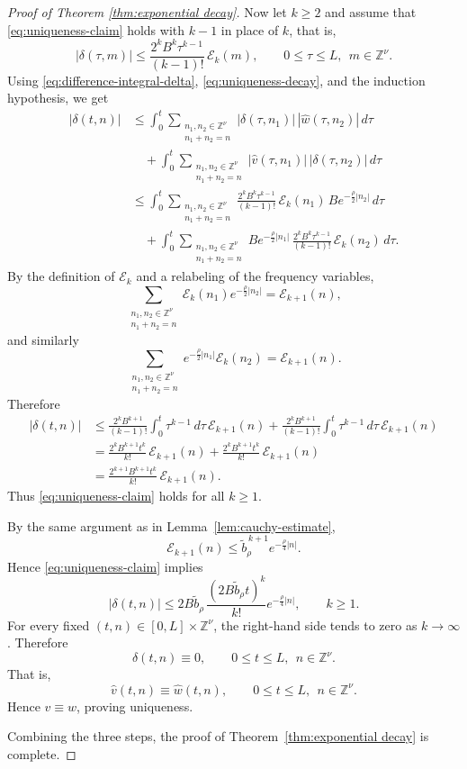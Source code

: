 \documentclass[12pt,reqno,tbtags]{amsart}
\newcommand\1{\mathbbm{1}}
\begin{document}
\begin{proof}[Proof of Theorem \ref{thm:exponential decay}]
Now let $k\geq 2$ and assume that \eqref{eq:uniqueness-claim} holds with $k-1$
in place of $k$, that is,
\[
|\delta(\tau,m)|
\leq
\frac{2^{k}B^{k}\tau^{k-1}}{(k-1)!}\,\mathcal{E}_{k}(m),
\qquad
0\leq \tau\leq L,\ \ m\in \mathbb{Z}^{\nu}.
\]
Using \eqref{eq:difference-integral-delta}, \eqref{eq:uniqueness-decay}, and the
induction hypothesis, we get
\begin{align*}
|\delta(t,n)|
&\leq
\int_0^t
\sum_{\substack{n_1,n_2\in \mathbb{Z}^{\nu}\\ n_1+n_2=n}}
|\delta(\tau,n_1)|\,|\widehat w(\tau,n_2)|\,d\tau \\
&\quad+
\int_0^t
\sum_{\substack{n_1,n_2\in \mathbb{Z}^{\nu}\\ n_1+n_2=n}}
|\widehat v(\tau,n_1)|\,|\delta(\tau,n_2)|\,d\tau \\
&\leq
\int_0^t
\sum_{\substack{n_1,n_2\in \mathbb{Z}^{\nu}\\ n_1+n_2=n}}
\frac{2^{k}B^{k}\tau^{k-1}}{(k-1)!}\,\mathcal{E}_{k}(n_1)\,
B e^{-\frac{\rho}{2}|n_2|}\,d\tau \\
&\quad+
\int_0^t
\sum_{\substack{n_1,n_2\in \mathbb{Z}^{\nu}\\ n_1+n_2=n}}
B e^{-\frac{\rho}{2}|n_1|}\,
\frac{2^{k}B^{k}\tau^{k-1}}{(k-1)!}\,\mathcal{E}_{k}(n_2)\,d\tau .
\end{align*}
By the definition of $\mathcal{E}_{k}$ and a relabeling of the frequency variables,
\[
\sum_{\substack{n_1,n_2\in \mathbb{Z}^{\nu}\\ n_1+n_2=n}}
\mathcal{E}_{k}(n_1)e^{-\frac{\rho}{2}|n_2|}
=
\mathcal{E}_{k+1}(n),
\]
and similarly
\[
\sum_{\substack{n_1,n_2\in \mathbb{Z}^{\nu}\\ n_1+n_2=n}}
e^{-\frac{\rho}{2}|n_1|}\mathcal{E}_{k}(n_2)
=
\mathcal{E}_{k+1}(n).
\]
Therefore
\begin{align*}
|\delta(t,n)|
&\leq
\frac{2^{k}B^{k+1}}{(k-1)!}
\int_0^t \tau^{k-1}\,d\tau \, \mathcal{E}_{k+1}(n)
+
\frac{2^{k}B^{k+1}}{(k-1)!}
\int_0^t \tau^{k-1}\,d\tau \, \mathcal{E}_{k+1}(n) \\
&=
\frac{2^{k}B^{k+1}t^k}{k!}\,\mathcal{E}_{k+1}(n)
+
\frac{2^{k}B^{k+1}t^k}{k!}\,\mathcal{E}_{k+1}(n) \\
&=
\frac{2^{k+1}B^{k+1}t^k}{k!}\,\mathcal{E}_{k+1}(n).
\end{align*}
Thus \eqref{eq:uniqueness-claim} holds for all $k\geq 1$.

By the same argument as in Lemma~\ref{lem:cauchy-estimate},
\[
\mathcal{E}_{k+1}(n)
\leq
\widetilde b_{\rho}^{\,k+1} e^{-\frac{\rho}{4}|n|}.
\]
Hence \eqref{eq:uniqueness-claim} implies
\[
|\delta(t,n)|
\leq
2B\widetilde b_{\rho}\,
\frac{(2B\widetilde b_{\rho}t)^k}{k!}
e^{-\frac{\rho}{4}|n|},
\qquad
k\geq 1.
\]
For every fixed $(t,n)\in [0,L]\times \mathbb{Z}^{\nu}$, the right-hand side tends to
zero as $k\to\infty$. Therefore
\[
\delta(t,n)\equiv 0,
\qquad
0\leq t\leq L,\ \ n\in \mathbb{Z}^{\nu}.
\]
That is,
\[
\widehat v(t,n)\equiv \widehat w(t,n),
\qquad
0\leq t\leq L,\ \ n\in \mathbb{Z}^{\nu}.
\]
Hence $v\equiv w$, proving uniqueness.

Combining the three steps, the proof of Theorem~\ref{thm:exponential decay} is complete.
\end{proof}
\end{document}
